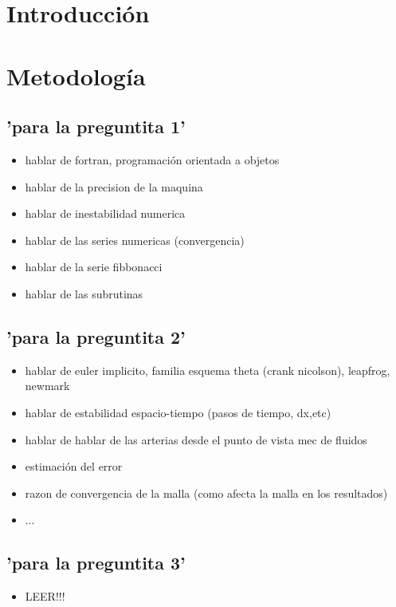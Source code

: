 \documentclass[letterpaper]{article}
\begin{document}
\newpage

\section{Introducción}







\newpage

\section{Metodología}

\subsection{'para la preguntita 1'}
\begin{itemize}
\item hablar de fortran, programación orientada a objetos
\item hablar de la precision de la maquina
\item hablar de inestabilidad numerica
\item hablar de las series numericas (convergencia)
\item hablar de la serie fibbonacci
\item hablar de las subrutinas
\end{itemize}
\subsection{'para la preguntita 2'}
\begin{itemize}
\item hablar de euler implicito, familia esquema theta (crank nicolson), leapfrog, newmark
\item hablar de estabilidad espacio-tiempo (pasos de tiempo, dx,etc)
\item hablar de hablar de las arterias desde el punto de vista mec de fluidos
\item estimación del error
\item razon de convergencia de la malla (como afecta la malla en los resultados)
\item ...
\end{itemize}
\subsection{'para la preguntita 3'}
\begin{itemize}
\item LEER!!!
\end{itemize}
\end{document}
